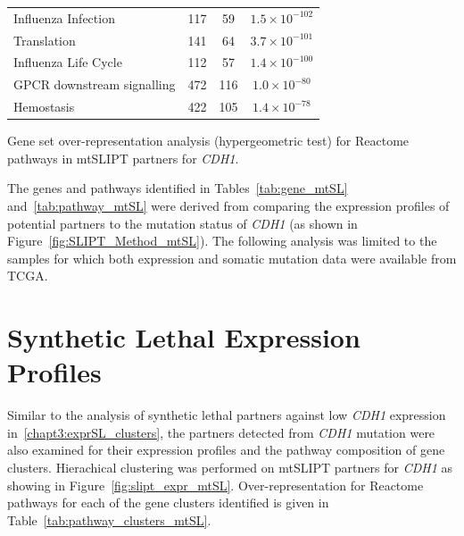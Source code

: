 \begin{table}[!ht]
{\begin{threeparttable}
\begin{tabular}{lccc}
  \rowcolor{black!5}
  Influenza Infection & 117 &  59 & $1.5 \times 10^{-102}$ \\ 
  \rowcolor{black!10}
  Translation & 141 &  64 & $3.7 \times 10^{-101}$ \\ 
  \rowcolor{black!5}
  Influenza Life Cycle & 112 &  57 & $1.4 \times 10^{-100}$ \\ 
  \rowcolor{black!10}
  GPCR downstream signalling & 472 & 116 & $1.0 \times 10^{-80}$ \\ 
  \rowcolor{black!5}
  Hemostasis & 422 & 105 & $1.4 \times 10^{-78}$ \\ 
  \hline
\end{tabular}
\begin{tablenotes}
\raggedright \small
Gene set over-representation analysis (hypergeometric test) for Reactome pathways in \acrshort{mtSLIPT} partners for \textit{CDH1}.
\end{tablenotes}
\end{threeparttable}
}
\end{table}

\FloatBarrier

The genes and pathways identified in Tables~\ref{tab:gene_mtSL} and~\ref{tab:pathway_mtSL} were derived from comparing the expression profiles of potential partners to the mutation status of \textit{CDH1} (as shown in Figure~\ref{fig:SLIPT_Method_mtSL}). The following analysis was limited to the samples for which both expression and somatic mutation data were available from \gls{TCGA}.

\FloatBarrier

\section{Synthetic Lethal Expression Profiles} \label{appendix:mtSL_clusters}

Similar to the analysis of synthetic lethal partners against low \textit{CDH1} expression in~\ref{chapt3:exprSL_clusters}, the partners detected from \textit{CDH1} mutation were also examined for their expression profiles and the pathway composition of gene clusters. Hierachical clustering was performed on \acrshort{mtSLIPT} partners for \textit{CDH1} as showing in Figure~\ref{fig:slipt_expr_mtSL}. Over-representation for Reactome pathways for each of the gene clusters identified is given in Table~\ref{tab:pathway_clusters_mtSL}.

